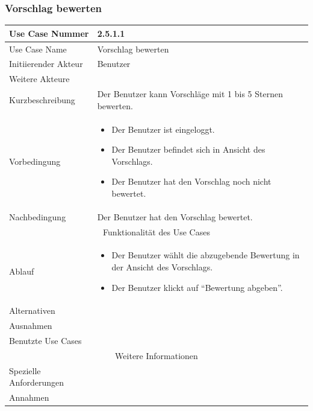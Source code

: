 \documentclass[10pt,a4paper]{article}
\begin{document}
\subsubsection{Vorschlag bewerten}
	\begin{tabular}{|l|p{.5\linewidth}|}
	\hline Use Case Nummer & 2.5.1.1 \\ 
	\hline Use Case Name & Vorschlag bewerten \\ 
	\hline Initiierender Akteur & Benutzer \\
	\hline Weitere Akteure &  \\
	\hline Kurzbeschreibung & Der Benutzer kann Vorschl\"age mit 1 bis 5 Sternen bewerten. \\
	\hline Vorbedingung & \begin{itemize}
        	\item Der Benutzer ist eingeloggt.
                \item Der Benutzer befindet sich in Ansicht des Vorschlags.
                \item Der Benutzer hat den Vorschlag noch nicht bewertet.
                \end{itemize} \\
	\hline Nachbedingung & Der Benutzer hat den Vorschlag bewertet. \\
	\hline \multicolumn{2}{|c|}{Funktionalität des Use Cases}\\
	\hline Ablauf & \begin{itemize}
		\item Der Benutzer w\"ahlt die abzugebende Bewertung in der Ansicht des Vorschlags.
		\item Der Benutzer klickt auf ``Bewertung abgeben''.
	\end{itemize} \\
	\hline Alternativen &  \\
	\hline Ausnahmen &  \\
	\hline Benutzte Use Cases &  \\
	\hline \multicolumn{2}{|c|}{Weitere Informationen} \\
	\hline Spezielle Anforderungen &  \\
	\hline Annahmen &  \\
	\hline
	\end{tabular}
\end{document}
